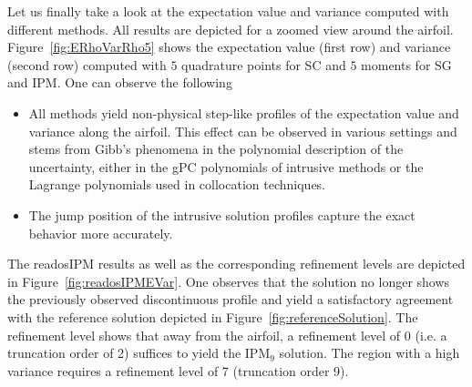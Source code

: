 Let us finally take a look at the expectation value and variance computed with different methods. All results are depicted for a zoomed view around the airfoil. Figure~\ref{fig:ERhoVarRho5} shows the expectation value (first row) and variance (second row) computed with $5$ quadrature points for SC and $5$ moments for SG and IPM. One can observe the following
\begin{itemize}
\item All methods yield non-physical step-like profiles of the expectation value and variance along the airfoil. This effect can be observed in various settings \cite{le2004uncertainty,kusch2018filtered,poette2019contribution,barth2013non,dwight2013adaptive} and stems from Gibb's phenomena in the polynomial description of the uncertainty, either in the gPC polynomials of intrusive methods or the Lagrange polynomials used in collocation techniques. 
\item The jump position of the intrusive solution profiles capture the exact behavior more accurately.
\end{itemize}
The readosIPM results as well as the corresponding refinement levels are depicted in Figure~\ref{fig:readosIPMEVar}. One observes that the solution no longer shows the previously observed discontinuous profile and yield a satisfactory agreement with the reference solution depicted in Figure~\ref{fig:referenceSolution}. The refinement level shows that away from the airfoil, a refinement level of 0 (i.e. a truncation order of 2) suffices to yield the IPM$_9$ solution. The region with a high variance requires a refinement level of 7 (truncation order 9).
